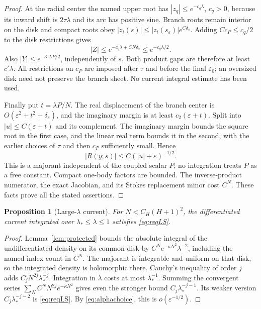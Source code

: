\documentclass[11pt]{article}
\numberwithin{equation}{section}
\newtheorem{proposition}[theorem]{Proposition}
\theoremstyle{definition}
\newcommand{\eps}{\varepsilon}
\begin{document}
\begin{proof}
At the radial center the named upper root has
\(|z_q|\le e^{-c_q\lambda}\), \(c_q>0\), because its inward
shift is \(2\tau\lambda\) and its arc has positive sine.
Branch roots remain interior on the disk and compact roots obey
\(|z_i(s)|\le |z_i(s_\eps)|e^{C\delta_s}\).
Adding \(Cc_P\le c_q/2\) to the disk restrictions gives
\[
 |Z|\le e^{-c_q\lambda+CN\delta_s}\le e^{-c_q\lambda/2}.
\]
Also \(|Y|\le e^{-3\tau\lambda P/2}\), independently of \(s\).
Both product gaps are therefore at least \(c'\lambda\).
All restrictions on \(c_P\) are imposed after \(\tau\) and
before the final \(\eps_0\); an oversized disk need not preserve
the branch sheet. No current integral estimate has been used.

Finally put \(t=\lambda P/N\). The real displacement of the
branch center is \(O(\eps^2+t^2+\delta_s)\), and the imaginary
margin is at least \(c_2(\eps+t)\).
Split into \(|u|\le C(\eps+t)\) and its complement.
The imaginary margin bounds the square root in the first
case, and the linear real term bounds it in the second, with
the earlier choices of \(\tau\) and then \(c_P\) sufficiently small. Hence
\[
 |R(y;s)|\le C(|u|+\eps)^{-1/2}.
\]
This is a majorant independent of the coupled scalar \(P\);
no integration treats \(P\) as a free constant. Compact
one-body factors are bounded. The inverse-product numerator,
the exact Jacobian, and its Stokes replacement minor cost
\(C^N\). These facts prove all the stated assertions.
\end{proof}

\begin{proposition}[Large-\(\lambda\) current]\label{prop:largeS}
For \(N<C_H(H+1)^2\), the differentiated current integrated over
\(\lambda_*\le\lambda\le1\) satisfies \eqref{eq:reqLS}.
\end{proposition}
\begin{proof}
Lemma~\ref{lem:protected} bounds the absolute integral of
the undifferentiated density on its common disk by
\(C^Ne^{-\kappa N^2}\lambda^{-2}\), including the named-index
count in \(C^N\). The majorant is integrable and uniform on
that disk, so the integrated density is holomorphic there.
Cauchy's inequality of order \(j\) adds
\(C_jN^{2j}\lambda_*^{-j}\). Integration in \(\lambda\) costs
at most \(\lambda_*^{-1}\). Summing the convergent series
\(\sum_N C^NN^{2j}e^{-\kappa N^2}\) gives even the stronger
bound \(C_j\lambda_*^{-j-1}\). Its weaker version
\(C_j\lambda_*^{-j-2}\) is \eqref{eq:reqLS}.
By \eqref{eq:alphachoice}, this is \(o(\eps^{-1/2})\).
\end{proof}
\end{document}

